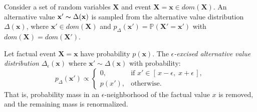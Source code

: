 \documentclass[anon,12pt]{clear2025} %
\begin{document}
\begin{definition}
Consider a set of random variables $\mathbf{X}$ and event $\mathbf{X}=\mathbf{x}\in dom(\mathbf{X})$. An alternative value $\mathbf{x}' \thicksim \Delta(\mathbf{x})$ is sampled from the alternative value distribution $\Delta(\mathbf{x})$, where $\mathbf{x}' \in dom (\mathbf{X})$ and $p_\Delta(\mathbf{x}') = \mathbb{P}(\mathbf{X}'=\mathbf{x'})$ with $dom(\mathbf{X}) = dom(\mathbf{X}')$.
\end{definition}

\begin{example}
Let factual event $\mathbf{X}=\mathbf{x}$ have probability $p(\mathbf{x})$.
The \emph{$\epsilon$-excised alternative value distribution} $\Delta_{\epsilon}(\mathbf{x})$
 where $\mathbf{x}' \sim \Delta(\mathbf{x})$ with probability:
\[
p_\Delta(\mathbf{x}') \propto 
\begin{cases}
    0, & \text{if } x' \in [\,x - \epsilon,\; x + \epsilon\,], \\[6pt]
    p(x'), & \text{otherwise}.
\end{cases}
\]
That is, probability mass in an $\epsilon$-neighborhood of the factual value $x$
is removed, and the remaining mass is renormalized.
\end{example}
\end{document}
